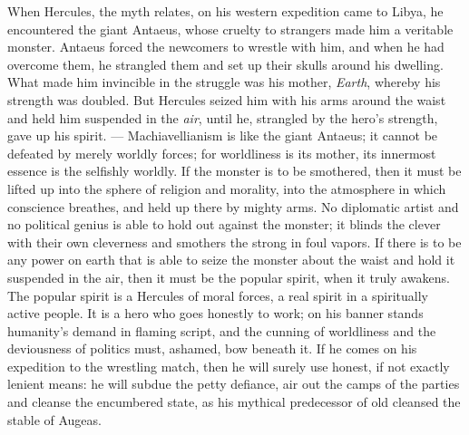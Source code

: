 \documentclass[12pt,a4paper,openany]{book}
\newcommand{\opage}[1]{\marginnote{\footnotesize\textit{[#1]}}}
\begin{document}
When Hercules, the myth relates, on his western expedition
came to Libya, he encountered the giant Antaeus, whose
cruelty to strangers made him a veritable
monster. Antaeus forced the newcomers to wrestle
with him, and when he had overcome them, he strangled
them and set up their skulls around his
dwelling. What made him invincible in the struggle
was his mother, \emph{Earth}, whereby his strength was doubled.
But Hercules seized him with his arms around the
waist and held him suspended in the \emph{air}, until he,
strangled by the hero's strength, gave up his spirit. --- Machiavellianism
is like the giant Antaeus; it cannot be defeated
by merely worldly forces; for worldliness is
its mother, its innermost essence is the selfishly worldly.
If the monster is to be smothered, then it must be lifted up into the sphere of
religion and morality, into the atmosphere
in which conscience breathes, and held up there by mighty
arms. No diplomatic artist and no political
genius is able to hold out against the monster; it
blinds the clever with their own cleverness and smothers
\setcounter{footnote}{0}%
\opage{103}the strong in foul vapors. If there is to be any
power on earth that is able to seize the monster about the
waist and hold it suspended in the air, then it must be
the popular spirit, when it truly awakens. The popular spirit is
a Hercules of moral forces, a real spirit in a
spiritually active people. It is a hero who goes
honestly to work; on his banner stands humanity's
demand in flaming script, and the cunning of worldliness
and the deviousness of politics must, ashamed, bow
beneath it. If he comes on his expedition to
the wrestling match, then he will surely use honest, if
not exactly lenient means: he will subdue the petty
defiance, air out the camps of the parties and cleanse the encumbered
state, as his mythical predecessor of old
cleansed the stable of Augeas.
\end{document}
